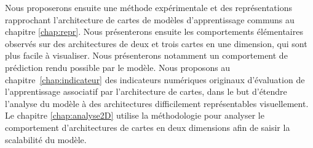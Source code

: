 Nous proposerons ensuite une méthode expérimentale et des représentations rapprochant l'architecture de cartes de modèles d'apprentissage communs au chapitre \ref{chap:repr}.
Nous présenterons ensuite les comportements élémentaires observés sur des architectures de deux et trois cartes en une dimension, qui sont plus facile à visualiser. 
Nous présenterons notamment un comportement de prédiction rendu possible par le modèle.
Nous proposons au chapitre~\ref{chap:indicateur} des indicateurs numériques originaux d'évaluation de l'apprentissage associatif par l'architecture de cartes, dans le but d'étendre l'analyse du modèle à des architectures difficilement représentables visuellement.
Le chapitre \ref{chap:analyse2D} utilise la méthodologie pour analyser le comportement d'architectures de cartes en deux dimensions afin de saisir la scalabilité du modèle.












